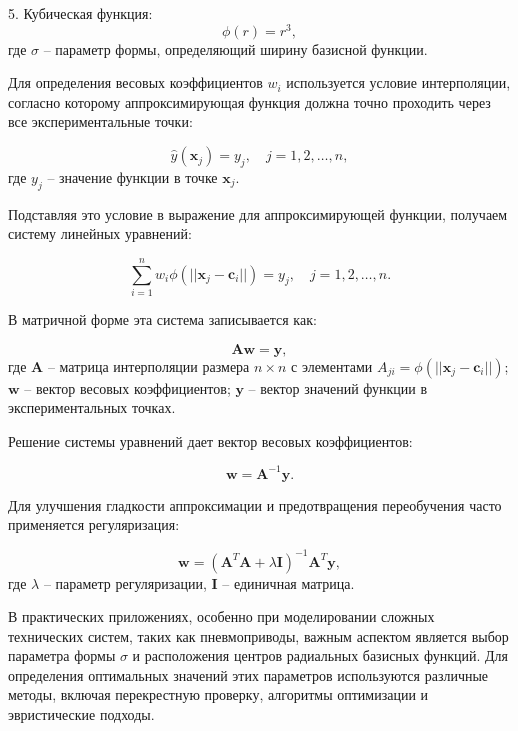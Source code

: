 5. Кубическая функция:
\begin{equation}
\phi(r) = r^3,
\end{equation}
где $\sigma$ -- параметр формы, определяющий ширину базисной функции.

Для определения весовых коэффициентов $w_i$ используется условие интерполяции,
согласно которому аппроксимирующая функция должна точно проходить через все экспериментальные точки:

\begin{equation}
\hat{y}(\mathbf{x}_j) = y_j, \quad j = 1, 2, \ldots, n,
\end{equation}
где $y_j$ -- значение функции в точке $\mathbf{x}_j$.

Подставляя это условие в выражение для аппроксимирующей функции, получаем систему линейных уравнений:

\begin{equation}
\sum_{i=1}^{n} w_i \phi(||\mathbf{x}_j - \mathbf{c}_i||) = y_j, \quad j = 1, 2, \ldots, n.
\end{equation}

В матричной форме эта система записывается как:

\begin{equation}
\mathbf{A} \mathbf{w} = \mathbf{y},
\end{equation}
где $\mathbf{A}$ -- матрица интерполяции размера $n \times n$ с элементами $A_{ji} = \phi(||\mathbf{x}_j - \mathbf{c}_i||)$;
$\mathbf{w}$ -- вектор весовых коэффициентов;
$\mathbf{y}$ -- вектор значений функции в экспериментальных точках.

Решение системы уравнений дает вектор весовых коэффициентов:

\begin{equation}
\mathbf{w} = \mathbf{A}^{-1} \mathbf{y}.
\end{equation}

Для улучшения гладкости аппроксимации и предотвращения переобучения часто применяется регуляризация:

\begin{equation}
\mathbf{w} = (\mathbf{A}^T\mathbf{A} + \lambda \mathbf{I})^{-1} \mathbf{A}^T \mathbf{y},
\end{equation}
где $\lambda$ -- параметр регуляризации, $\mathbf{I}$ -- единичная матрица.

В практических приложениях, особенно при моделировании сложных технических
систем, таких как пневмоприводы, важным аспектом является выбор параметра формы $\sigma$ и
расположения центров радиальных базисных функций. Для определения оптимальных значений этих
параметров используются различные методы, включая перекрестную проверку, алгоритмы оптимизации и эвристические подходы.

